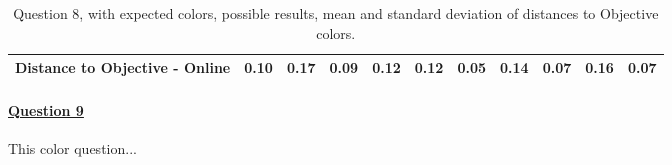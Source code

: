 \begin{table}[H]
{\begin{tabular}{lccccccccccccc}
    \multicolumn{4}{l}{Distance to Objective - Online}                                                                                               & \multicolumn{1}{|c}{0.10}        & \multicolumn{1}{c|}{0.17}    & \multicolumn{1}{|c}{\textbf{0.09}}        & \multicolumn{1}{c|}{0.12}    & \multicolumn{1}{|c}{0.12}       & \multicolumn{1}{c|}{0.05}    & \multicolumn{1}{|c}{0.14}        & \multicolumn{1}{c|}{0.07}    & \multicolumn{1}{|c}{0.16}       & \multicolumn{1}{c|}{0.07}    \\ \hline
    \end{tabular}}
  \caption[Question 8, with expected Results.]{Question 8, with expected colors, possible results, mean and standard deviation of distances to Objective colors.}
  \label{table:lab_q8_expected}
\end{table}
%
\paragraph{\ul{Question 9}}
%
This color question...
%

